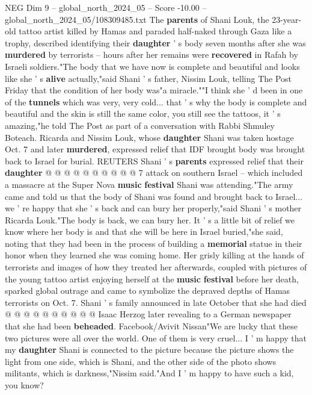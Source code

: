 \begin{textsample}{NEG Dim 9 – global\_north\_2024\_05 – Score -10.00 – global\_north\_2024\_05/108309485.txt}  \label{ex:f9_neg_231}
The \textbf{parents} of Shani Louk, the 23-year-old tattoo artist killed by Hamas and paraded half-naked through Gaza like a trophy, described identifying their \textbf{daughter} ' s body seven months after she was \textbf{murdered} by terrorists -- hours after her remains were \textbf{recovered} in Rafah by Israeli soldiers."The body that we have now is complete and beautiful and looks like she ' s \textbf{alive} actually,"said Shani ' s father, Nissim Louk, telling The Post Friday that the condition of her body was"a miracle.""I think she ' d been in one of the \textbf{tunnels} which was very, very cold... that ' s why the body is complete and beautiful and the skin is still the same color, you still see the tattoos, it ' s amazing,"he told The Post as part of a conversation with Rabbi Shmuley Boteach.
Ricarda and Nissim Louk, whose \textbf{daughter} Shani was taken hostage Oct. 7 and later \textbf{murdered}, expressed relief that IDF brought body was brought back to Israel for burial.
REUTERS Shani ' s \textbf{parents} expressed relief that their \textbf{daughter} @ @ @ @ @ @ @ @ @ @ 7 attack on southern Israel -- which included a massacre at the Super Nova \textbf{music} \textbf{festival} Shani was attending."The army came and told us that the body of Shani was found and brought back to Israel... we ' re happy that she ' s back and can bury her properly,"said Shani ' s mother Ricarda Louk."The body is back, we can bury her.
It ' s a little bit of relief we know where her body is and that she will be here in Israel buried,"she said, noting that they had been in the process of building a \textbf{memorial} statue in their honor when they learned she was coming home.
Her grisly killing at the hands of terrorists and images of how they treated her afterwards, coupled with pictures of the young tattoo artist enjoying herself at the \textbf{music} \textbf{festival} before her death, sparked global outrage and came to symbolize the depraved depths of Hamas terrorists on Oct. 7.
Shani ' s family announced in late October that she had died @ @ @ @ @ @ @ @ @ @ Isaac Herzog later revealing to a German newspaper that she had been \textbf{beheaded}.
Facebook/Avivit Nissan"We are lucky that these two pictures were all over the world.
One of them is very cruel...
I ' m happy that my \textbf{daughter} Shani is connected to the picture because the picture shows the light from one side, which is Shani, and the other side of the photo shows militants, which is darkness,"Nissim said."And I ' m happy to have such a kid, you know?

\end{textsample}

